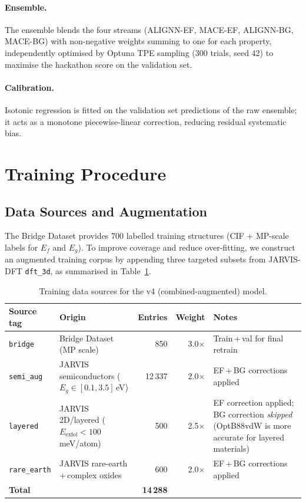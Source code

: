 \documentclass[10pt, a4paper]{article}
\begin{document}
\paragraph{Ensemble.}
The ensemble blends the four streams (ALIGNN-EF, MACE-EF,
ALIGNN-BG, MACE-BG) with non-negative weights summing to one for
each property, independently optimised by Optuna TPE sampling
(300 trials, seed 42) to maximise the hackathon score on the
validation set.

\paragraph{Calibration.}
Isotonic regression is fitted on the validation set predictions of the
raw ensemble; it acts as a monotone piecewise-linear correction,
reducing residual systematic bias.

\section{Training Procedure}

\subsection{Data Sources and Augmentation}

The Bridge Dataset provides 700 labelled training structures (CIF +
MP-scale labels for $E_f$ and $E_g$).
To improve coverage and reduce over-fitting, we construct an augmented
training corpus by appending three targeted subsets from JARVIS-DFT
\texttt{dft\_3d}, as summarised in Table~\ref{tab:datasources}.

\begin{table}[h!]
\centering
\caption{Training data sources for the v4 (combined-augmented) model.}
\label{tab:datasources}
\begin{tabular}{@{}llrrl@{}}
\toprule
Source tag & Origin & Entries & Weight & Notes \\
\midrule
\texttt{bridge}     & Bridge Dataset (MP scale) & 850  & 3.0$\times$ &
  Train\,+\,val for final retrain \\
\texttt{semi\_aug}  & JARVIS semiconductors
  ($E_g \in [0.1, 3.5]$\,eV) & 12\,337 & 2.0$\times$ &
  EF\,+\,BG corrections applied \\
\texttt{layered}    & JARVIS 2D/layered
  ($E_\text{exfol} < 100$\,meV/atom) & 500 & 2.5$\times$ &
  EF correction applied; BG correction \emph{skipped}
  (OptB88vdW is more accurate for layered materials) \\
\texttt{rare\_earth}& JARVIS rare-earth\,+\,complex oxides & 600 & 2.0$\times$ &
  EF\,+\,BG corrections applied \\
\midrule
\textbf{Total} & & \textbf{14\,288} & & \\
\bottomrule
\end{tabular}
\end{table}
\end{document}

